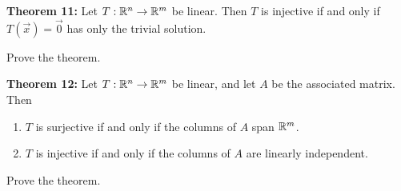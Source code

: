 \begin{enumerate}
\newpage

{\bf Theorem 11:} Let $T: \mathbb{R}^n \to \mathbb{R}^m$ be linear. Then $T$ is injective if and only if $T(\vec{x})=\vec{0}$ has only the trivial solution.

\Problem Prove the theorem.

\vfill 

{\bf Theorem 12:} Let $T: \mathbb{R}^n \to \mathbb{R}^m$ be linear, and let $A$ be the associated matrix. Then 
\begin{enumerate}
\item $T$ is surjective if and only if the columns of $A$ span $\mathbb{R}^m$.
\item $T$ is injective if and only if the columns of $A$ are linearly independent. 
\end{enumerate}

\Problem Prove the theorem.

\vfill 

\end{enumerate}

